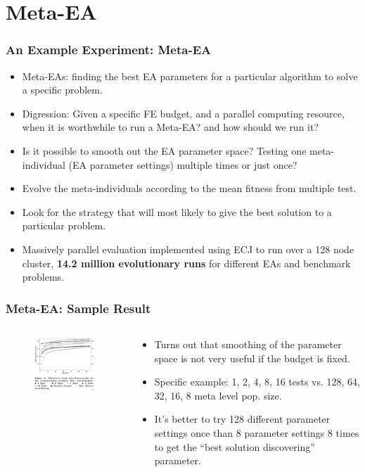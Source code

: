 \documentclass{beamer}
\begin{document}
\section{Meta-EA}	%
\begin{frame}
	\frametitle{An Example Experiment: Meta-EA}
	\begin{footnotesize}
	\begin{itemize}
		\item Meta-EAs: finding the best EA parameters for a particular algorithm to solve a specific problem.
		\item Digression: Given a specific FE budget, and a parallel computing resource, when it is worthwhile to run a Meta-EA? and how should we run it?
		\item Is it possible to smooth out the EA parameter space? Testing one meta-individual (EA parameter settings) multiple times or just once?
		\item Evolve the meta-individuals according to the mean fitness from multiple test.
		\item Look for the strategy that will most likely to give the best solution to a particular problem.
		\item Massively parallel evaluation implemented using ECJ to run over a 128 node cluster, \textbf{14.2 million evolutionary runs} for different EAs and benchmark problems.
	\end{itemize}
	\end{footnotesize}
\end{frame}
%
\begin{frame}
	\frametitle{Meta-EA: Sample Result}
	\begin{columns}[c]
		\column{2.5in}
			\begin{figure}
				\centering
				\includegraphics[width=2.5in,keepaspectratio]{meta-ea.pdf}
			\end{figure}
		\column{2.5in}
		\begin{scriptsize}
			\begin{itemize}
				\setlength{\itemsep}{0.30cm}
					\item Turns out that smoothing of the parameter space is not very useful if the budget is fixed.
					\item Specific example: 1, 2, 4, 8, 16 tests vs. 128, 64, 32, 16, 8 meta level pop. size.
					\item It's better to try 128 different parameter settings once than 8 parameter settings 8 times to get the ``best solution discovering'' parameter.
			\end{itemize}
		\end{scriptsize}
	\end{columns}
\end{frame}
\end{document}
